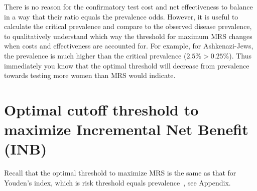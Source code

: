 \documentclass[11pt]{article}
\begin{document}
There is no reason for the confirmatory test cost and net effectiveness to balance in a way that their ratio equals the prevalence odds.  However, it is useful to calculate the critical prevalence and compare to the observed disease prevalence, to qualitatively understand which way the threshold for maximum MRS changes when costs and effectiveness are accounted for.  For example, for Ashkenazi-Jews, the prevalence is much higher than the critical prevalence ($2.5\% > 0.25\%$).  Thus immediately you know that the optimal threshold will decrease from prevalence towards testing more women than MRS would indicate.  



\section{Optimal cutoff threshold to maximize Incremental Net Benefit (INB)}

Recall that the optimal threshold to maximize MRS is the same as that for Youden's index, which is risk threshold equals prevalence~\citep{katki}, see Appendix.
\end{document}
